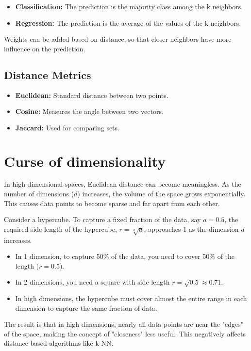 \documentclass{article}
\begin{document}
\begin{multicols}{2}
	\begin{itemize}
		\item \textbf{Classification:} The prediction is the majority class among the k neighbors.
		\item \textbf{Regression:} The prediction is the average of the values of the k neighbors.
	\end{itemize}

	Weights can be added based on distance, so that closer neighbors have more influence on the prediction.

	\subsection{Distance Metrics}
	\begin{itemize}
		\item \textbf{Euclidean:} Standard distance between two points.
		\item \textbf{Cosine:} Measures the angle between two vectors.
		\item \textbf{Jaccard:} Used for comparing sets.
	\end{itemize}

	\section{Curse of dimensionality}
	In high-dimensional spaces, Euclidean distance can become meaningless.  As the number of dimensions ($d$) increases, the volume of the space grows exponentially.  This causes data points to become sparse and far apart from each other.

	Consider a hypercube. To capture a fixed fraction of the data, say $a=0.5$, the required side length of the hypercube, $r = \sqrt[d]{a}$, approaches 1 as the dimension $d$ increases.
	\begin{itemize}
		\item In 1 dimension, to capture 50\% of the data, you need to cover 50\% of the length ($r=0.5$).
		\item In 2 dimensions, you need a square with side length $r = \sqrt{0.5} \approx 0.71$.
		\item In high dimensions, the hypercube must cover almost the entire range in each dimension to capture the same fraction of data.
	\end{itemize}
	The result is that in high dimensions, nearly all data points are near the "edges" of the space, making the concept of "closeness" less useful.  This negatively affects distance-based algorithms like k-NN.


\end{multicols}
\end{document}
